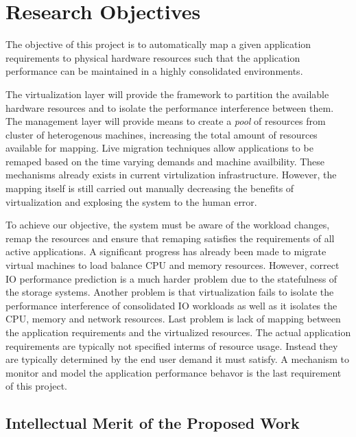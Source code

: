 \section{Research Objectives}
\label{objectives}
%
The objective of this project is to automatically map a given application requirements to physical hardware resources such that the application performance can be maintained in a highly consolidated environments. 

The virtualization layer will provide the framework to partition the available hardware resources and to isolate the performance interference between them\cite{}. 
The management layer will provide means to create a \emph{pool} of resources from cluster of heterogenous machines\cite{}, increasing the total amount of resources available for mapping. 
Live migration techniques\cite{} allow applications to be remaped based on the time varying demands and machine availbility. 
These mechanisms already exists in current virtulization infrastructure.
However, the mapping itself is still carried out manually decreasing the benefits of virtualization and explosing the system to the human error. 

To achieve our objective, the system must be aware of the workload changes, remap the resources and ensure that remaping satisfies the requirements of all active applications.
A significant progress has already been made to migrate virtual machines to load balance CPU and memory resources\cite{}.
However, correct IO performance prediction is a much harder problem due to the statefulness of the storage systems\cite{}.
Another problem is that virtualization fails to isolate the performance interference of consolidated IO workloads as well as it isolates the CPU, memory and network resources. 
Last problem is lack of mapping between the application requirements and the virtualized resources. 
The actual application requirements are typically not specified interms of resource usage. 
Instead they are typically determined by the end user demand it must satisfy.   
A mechanism to monitor and model the application performance behavor is the last requirement of this project. 

\subsection{Intellectual Merit of the Proposed Work}

